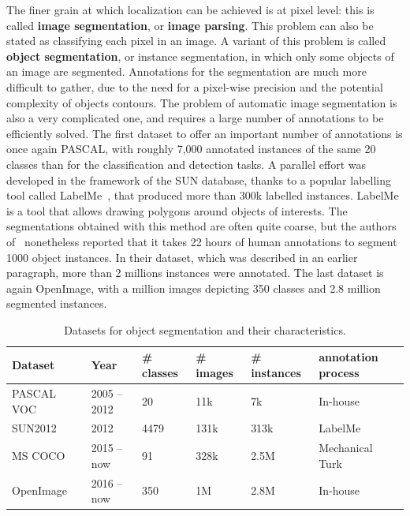 The finer grain at which localization can be achieved is at pixel level:
this is called \textbf{image segmentation}, or \textbf{image parsing}.
This problem can also be stated as classifying each pixel in an image.
A variant of this problem is called \textbf{object segmentation},
or instance segmentation, in which only some objects of an image are segmented.
Annotations for the segmentation are much more difficult to gather,
due to the need for a pixel-wise precision
and the potential complexity of objects contours.
The problem of automatic image segmentation is also a very complicated one,
and requires a large number of annotations to be efficiently solved.
The first dataset to offer an important number of annotations is once again PASCAL,
with roughly 7,000 annotated instances of the same 20 classes
than for the classification and detection tasks.
A parallel effort was developed in the framework of the SUN database,
thanks to a popular labelling tool called LabelMe~\cite{russell2008labelme},
that produced more than 300k labelled instances.
LabelMe is a tool that allows drawing polygons around objects of interests.
The segmentations obtained with this method are often quite coarse,
but the authors of~\cite{lin2014microsoft} nonetheless reported that
it takes 22 hours of human annotations to segment 1000 object instances.
In their dataset, which was described in an earlier paragraph,
more than 2 millions instances were annotated.
The last dataset is again OpenImage, with a million images depicting 350 classes
and 2.8 million segmented instances.

\begin{table}
\centering
\caption{Datasets for object segmentation and their characteristics.}
\begin{tabular}{llllll}
	Dataset & Year & \# classes & \# images & \# instances & annotation process \\
	\midrule
	PASCAL VOC~\cite{Everingham10} & 2005 -- 2012 & 20 & 11k & 7k & In-house \\
	SUN2012~\cite{xiao2010sun} & 2012 & 4479 & 131k & 313k & LabelMe~\cite{russell2008labelme,barriuso2012notes} \\
	MS COCO~\cite{lin2014microsoft} & 2015 -- now & 91 & 328k & 2.5M & Mechanical Turk \\
	OpenImage~\cite{OpenImages, OpenImages2} & 2016 -- now & 350 & 1M & 2.8M & In-house \\
\end{tabular}%
\label{tab:segmentation_ds}
\end{table}


